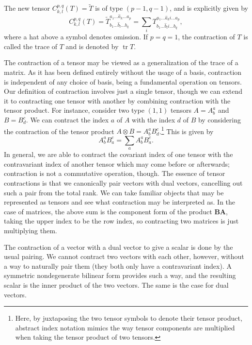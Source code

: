 \documentclass[a4paper,12pt]{article}
\begin{document}
\begin{remark}
    The new tensor $C^{p, q}_{k, l}(T) = \widetilde{T}$ is of type $(p - 1, q - 1)$, and is explicitly given by
    \begin{equation}
        C^{p, q}_{k, l}(T) = \widetilde{T}^{a_1 \ldots \widehat{a}_k \ldots a_p}_{b_1 \ldots \widehat{b}_l \ldots b_q} = \sum_i T^{a_1 \ldots \widehat{a}_k i \ldots a_p}_{b_1 \ldots \widehat{b}_l i \ldots b_q},
    \end{equation}
    where a hat above a symbol denotes omission.
    If $p = q = 1$, the contraction of $T$ is called the trace of $T$ and is denoted by $\operatorname{tr}T$.
\end{remark}
The contraction of a tensor may be viewed as a generalization of the trace of a matrix.
As it has been defined entirely without the usage of a basis, contraction is independent of any choice of basis, being a fundamental operation on tensors.
Our definition of contraction involves just a single tensor, though we can extend it to contracting one tensor with another by combining contraction with the tensor product.
For instance, consider two type $(1, 1)$ tensors $A = A^a_b$ and $B = B^c_d$.
We can contract the index $a$ of $A$ with the index $d$ of $B$ by considering the contraction of the tensor product $A \otimes B = A^a_b B^c_d$.\footnote{Here, by juxtaposing the two tensor symbols to denote their tensor product, abstract index notation mimics the way tensor components are multiplied when taking the tensor product of two tensors.}
This is given by
\begin{equation}
    A^a_b B^c_a = \sum_a A^a_b B^c_a.
\end{equation}
In general, we are able to contract the covariant index of one tensor with the contravariant index of another tensor which may come before or afterwards; contraction is not a commutative operation, though.
The essence of tensor contractions is that we canonically pair vectors with dual vectors, cancelling out such a pair from the total rank.
We can take familiar objects that may be represented as tensors and see what contraction may be interpreted as.
In the case of matrices, the above sum is the component form of the product $\mathbf{BA}$, taking the upper index to be the row index, so contracting two matrices is just multiplying them.

The contraction of a vector with a dual vector to give a scalar is done by the usual pairing.
We cannot contract two vectors with each other, however, without a way to naturally pair them (they both only have a contravariant index).
A symmetric nondegenerate bilinear form provides such a way, and the resulting scalar is the inner product of the two vectors.
The same is the case for dual vectors.
\end{document}
